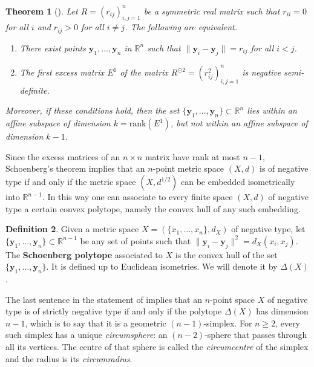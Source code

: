 \documentclass[a4paper, oneside, reqno]{amsart}
\newtheorem{theorem}{Theorem}[section]
\theoremstyle{definition}
\newtheorem{definition}[theorem]{Definition}
\theoremstyle{remark}
\numberwithin{equation}{section}
\newcommand{\demph}[1]{\emph{#1}}
\renewcommand{\vec}{\mathbf}
\newcommand{\R}{\mathbb{R}}
\newcommand{\define}{\textbf}
\begin{document}
\begin{theorem}[{\cite[Theorem~1]{Schoenberg1935}}]
\label{thm:schoenberg}
Let \(R = \left(r_{ij} \right)_{i,j=1}^n\) be a symmetric real matrix such that \(r_{ii} = 0\) for all \(i\) and \(r_{ij} > 0\) for all \(i \neq j\). The following are equivalent.
\begin{enumerate}
\item There exist points \(\vec{y}_1, \ldots, \vec{y}_n\) in \(\R^n\) such that \(\|\vec{y}_i - \vec{y}_j\| = r_{ij}\) for all \(i < j\).
\item The first excess matrix \(E^1\) of the matrix \(R^{\odot 2} = (r_{ij}^2)_{i,j=1}^n\) is negative semi-definite.
\end{enumerate}
Moreover, if these conditions hold, then the set \(\{\vec{y}_1, \ldots, \vec{y}_n\} \subset \R^{n}\) lies within an affine subspace of dimension \(k = \mathrm{rank}(E^1)\), but not within an affine subspace of dimension \(k-1\).
\end{theorem}

Since the excess matrices of an \(n \times n\) matrix have rank at most \(n-1\), Schoenberg's theorem implies that an \(n\)-point metric space \((X,d)\) is of negative type if and only if the metric space \((X, d^{1/2})\) can be embedded isometrically into \(\R^{n-1}\). In this way one can associate to every finite space \((X, d)\) of negative type a certain convex polytope, namely the convex hull of any such embedding.

\begin{definition}
Given a metric space \(X = (\{x_1, \ldots, x_n\},d_X)\) of negative type, let \(\{\vec{y}_1, \ldots, \vec{y}_n\} \subset \R^{n-1}\) be any set of points such that \(\|\vec{y}_i - \vec{y}_j\|^2 = d_X(x_i,x_j)\). The \define{Schoenberg polytope} associated to \(X\) is the convex hull of the set \(\{\vec{y}_1, \ldots, \vec{y}_n\}\). It is defined up to Euclidean isometries. We will denote it by \(\Delta(X)\).
\end{definition}

The last sentence in the statement of  implies that an \(n\)-point space \(X\) of negative type is of strictly negative type if and only if the polytope \(\Delta(X)\) has dimension \(n-1\), which is to say that it is a geometric \((n-1)\)-simplex. For \(n \geq 2\), every such simplex has a unique \demph{circumsphere}: an \((n-2)\)-sphere that passes through all its vertices. The centre of that sphere is called the \emph{circumcentre} of the simplex and the radius is its \emph{circumradius}.
\end{document}

